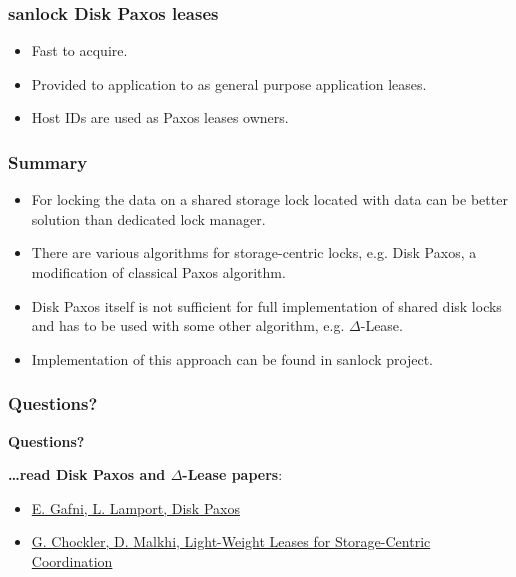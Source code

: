 \documentclass[10pt,utf8]{beamer}
\begin{document}
\begin{frame}
    \frametitle{sanlock Disk Paxos leases}
    \begin{itemize}
     \item Fast to acquire.
     \item Provided to application to as general purpose application leases.
     \item Host IDs are used as Paxos leases owners.
    \end{itemize}
\end{frame}

\begin{frame}
    \frametitle{Summary}
    \begin{itemize}
     \item For locking the data on a shared storage lock located with data can be better solution than dedicated lock manager.
     \item There are various algorithms for storage-centric locks, e.g. Disk Paxos, a modification of classical Paxos algorithm.
     \item Disk Paxos itself is not sufficient for full implementation of shared disk locks and has to be used with some other algorithm, e.g. $\Delta$-Lease.
     \item Implementation of this approach can be found in sanlock project.
    \end{itemize}
\end{frame}

\begin{frame}
    \frametitle{Questions?}
    \centering
    \textbf{\Huge{Questions?}}
    
    \vspace{1cm}
    
    \centering
    \textbf{\dots read Disk Paxos and $\Delta$-Lease papers}:
    \vspace{0.5cm}
    \begin{itemize}
     \item \small\color{blue}\href{http://lamport.azurewebsites.net/pubs/disk-paxos-disc.pdf}{E. Gafni, L. Lamport, Disk Paxos}\color{black}
     \item \color{blue}\href{https://groups.csail.mit.edu/tds/papers/Chockler/TR934.ps}{G. Chockler, D. Malkhi, Light-Weight Leases for Storage-Centric Coordination}\color{black}
    \end{itemize}

\end{frame}
    
\end{document}
